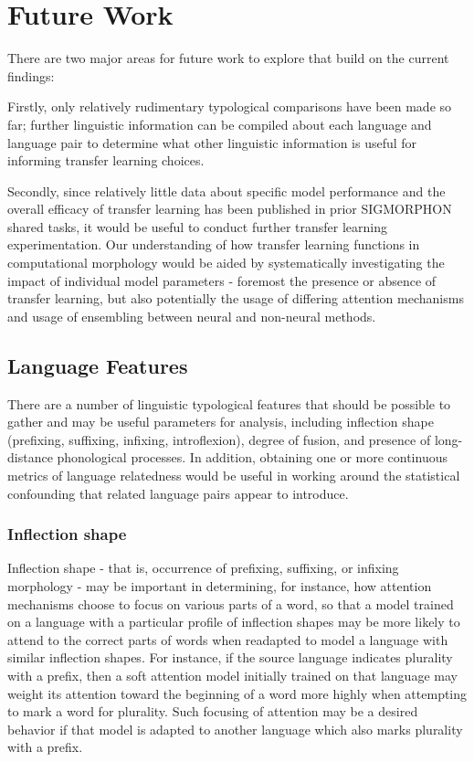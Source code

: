 \chapter{Future Work}

There are two major areas for future work to explore that build on the current findings:

Firstly, only relatively rudimentary typological comparisons have been made so far; further linguistic information can be compiled about each language and language pair to determine what other linguistic information is useful for informing transfer learning choices. 

Secondly, since relatively little data about specific model performance and the overall efficacy of transfer learning has been published in prior SIGMORPHON shared tasks, it would be useful to conduct further transfer learning experimentation. Our understanding of how transfer learning functions in computational morphology would be aided by systematically investigating the impact of individual model parameters - foremost the presence or absence of transfer learning, but also potentially the usage of differing attention mechanisms and usage of ensembling between neural and non-neural methods.

\section{Language Features}

There are a number of linguistic typological features that should be possible to gather and may be useful parameters for analysis, including inflection shape (prefixing, suffixing, infixing, introflexion), degree of fusion, and presence of long-distance phonological processes. In addition, obtaining one or more continuous metrics of language relatedness would be useful in working around the statistical confounding that related language pairs appear to introduce.

\subsection{Inflection shape}

Inflection shape - that is, occurrence of prefixing, suffixing, or infixing morphology - may be important in determining, for instance, how attention mechanisms choose to focus on various parts of a word, so that a model trained on a language with a particular profile of inflection shapes may be more likely to attend to the correct parts of words when readapted to model a language with similar inflection shapes. For instance, if the source language indicates plurality with a prefix, then a soft attention model initially trained on that language may weight its attention toward the beginning of a word more highly when attempting to mark a word for plurality. Such focusing of attention may be a desired behavior if that model is adapted to another language which also marks plurality with a prefix.

